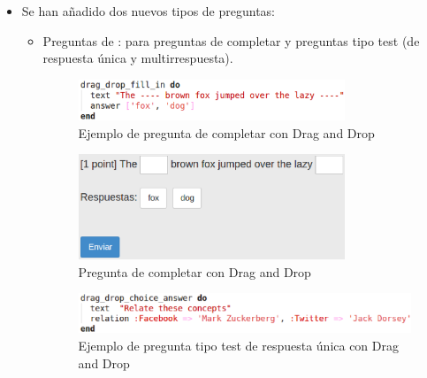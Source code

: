 \begin{itemize}
\begin{itemize}
  \end{itemize}
  \newpage
  
  \item Se han a\~{n}adido dos nuevos tipos de preguntas:
  \begin{itemize}
    \item Preguntas de : para preguntas de completar y preguntas tipo test (de respuesta \'unica
    y multirrespuesta).
    \begin{figure}[!th]
    \begin{center}
    \includegraphics[width=0.8\textwidth]{images/dd1.eps}
    \caption{Ejemplo de pregunta de completar con Drag and Drop}
    \label{fig:dd1}
    \end{center}
    \end{figure}
    
    \begin{figure}[!th]
    \begin{center}
    \includegraphics[width=0.8\textwidth]{images/dd1r.eps}
    \caption{Pregunta de completar con Drag and Drop}
    \label{fig:dd1r}
    \end{center}
    \end{figure}
    \newpage
    
    \begin{figure}[!th]
    \begin{center}
    \includegraphics[width=1\textwidth]{images/dd2.eps}
    \caption{Ejemplo de pregunta tipo test de respuesta \'unica con Drag and Drop}
    \label{fig:dd2}
    \end{center}
    \end{figure}
    

\end{itemize}
\end{itemize}
